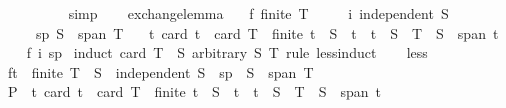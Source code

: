 \begin{isabellebody}
\ \ \ \ \ \ \ \ \isamarkupfalse%
\ simp\isanewline
\ \ \isamarkupfalse%
\isanewline
{}\isamarkupfalse%
%
\endisatagproof
{\isafoldproof}%
%
\isadelimproof
\isanewline
%
\endisadelimproof
\isanewline
{}\isamarkupfalse%
\ exchange{\isacharunderscore}{\kern0pt}lemma{\isacharcolon}{\kern0pt}\isanewline
\ \ \ f{\isacharcolon}{\kern0pt}\ {\isachardoublequoteopen}finite\ T{\isachardoublequoteclose}\isanewline
\ \ \ \ \ i{\isacharcolon}{\kern0pt}\ {\isachardoublequoteopen}independent\ S{\isachardoublequoteclose}\isanewline
\ \ \ \ \ sp{\isacharcolon}{\kern0pt}\ {\isachardoublequoteopen}S\ {\isasymsubseteq}\ span\ T{\isachardoublequoteclose}\isanewline
\ \ \ {\isachardoublequoteopen}{\isasymexists}t{\isacharprime}{\kern0pt}{\isachardot}{\kern0pt}\ card\ t{\isacharprime}{\kern0pt}\ {\isacharequal}{\kern0pt}\ card\ T\ {\isasymand}\ finite\ t{\isacharprime}{\kern0pt}\ {\isasymand}\ S\ {\isasymsubseteq}\ t{\isacharprime}{\kern0pt}\ {\isasymand}\ t{\isacharprime}{\kern0pt}\ {\isasymsubseteq}\ S\ {\isasymunion}\ T\ {\isasymand}\ S\ {\isasymsubseteq}\ span\ t{\isacharprime}{\kern0pt}{\isachardoublequoteclose}\isanewline
%
\isadelimproof
\ \ %
\endisadelimproof
%
\isatagproof
{}\isamarkupfalse%
\ f\ i\ sp\isanewline
{}\isamarkupfalse%
\ {\isacharparenleft}{\kern0pt}induct\ {\isachardoublequoteopen}card\ {\isacharparenleft}{\kern0pt}T\ {\isacharminus}{\kern0pt}\ S{\isacharparenright}{\kern0pt}{\isachardoublequoteclose}\ arbitrary{\isacharcolon}{\kern0pt}\ S\ T\ rule{\isacharcolon}{\kern0pt}\ less{\isacharunderscore}{\kern0pt}induct{\isacharparenright}{\kern0pt}\isanewline
\ \ \isamarkupfalse%
\ less\isanewline
\ \ \isamarkupfalse%
\ ft\ {\isacharequal}{\kern0pt}\ {\isacartoucheopen}finite\ T{\isacartoucheclose}\ \ S\ {\isacharequal}{\kern0pt}\ {\isacartoucheopen}independent\ S{\isacartoucheclose}\ \ sp\ {\isacharequal}{\kern0pt}\ {\isacartoucheopen}S\ {\isasymsubseteq}\ span\ T{\isacartoucheclose}\isanewline
\ \ \isamarkupfalse%
\ {\isacharquery}{\kern0pt}P\ {\isacharequal}{\kern0pt}\ {\isachardoublequoteopen}{\isasymlambda}t{\isacharprime}{\kern0pt}{\isachardot}{\kern0pt}\ card\ t{\isacharprime}{\kern0pt}\ {\isacharequal}{\kern0pt}\ card\ T\ {\isasymand}\ finite\ t{\isacharprime}{\kern0pt}\ {\isasymand}\ S\ {\isasymsubseteq}\ t{\isacharprime}{\kern0pt}\ {\isasymand}\ t{\isacharprime}{\kern0pt}\ {\isasymsubseteq}\ S\ {\isasymunion}\ T\ {\isasymand}\ S\ {\isasymsubseteq}\ span\ t{\isacharprime}{\kern0pt}{\isachardoublequoteclose}\isanewline

\end{isabellebody}
